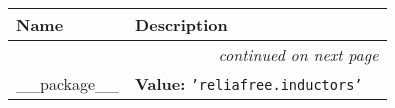    \vspace{-1cm}
\hspace{\varindent}\begin{longtable}{|p{\varnamewidth}|p{\vardescrwidth}|l}
\cline{1-2}
\cline{1-2} \centering \textbf{Name} & \centering \textbf{Description}& \\
\cline{1-2}
\endhead\cline{1-2}\multicolumn{3}{r}{\small\textit{continued on next page}}\\\endfoot\cline{1-2}
\endlastfoot\raggedright \_\-\_\-p\-a\-c\-k\-a\-g\-e\-\_\-\_\- & \raggedright \textbf{Value:} 
{\tt \texttt{'}\texttt{reliafree.inductors}\texttt{'}}&\\
\cline{1-2}
\end{longtable}

